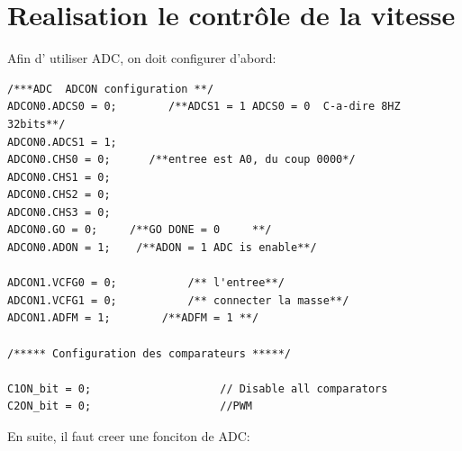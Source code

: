 \documentclass{article}
\begin{document}
\section{Realisation le contrôle de la vitesse}
Afin d' utiliser ADC, on doit configurer d'abord:
   



\begin{lstlisting}[frame=shadowbox]
/***ADC  ADCON configuration **/
ADCON0.ADCS0 = 0;        /**ADCS1 = 1 ADCS0 = 0  C-a-dire 8HZ 32bits**/
ADCON0.ADCS1 = 1;
ADCON0.CHS0 = 0;      /**entree est A0, du coup 0000*/
ADCON0.CHS1 = 0;
ADCON0.CHS2 = 0;
ADCON0.CHS3 = 0;
ADCON0.GO = 0;     /**GO DONE = 0     **/
ADCON0.ADON = 1;    /**ADON = 1 ADC is enable**/

ADCON1.VCFG0 = 0;           /** l'entree**/
ADCON1.VCFG1 = 0;           /** connecter la masse**/
ADCON1.ADFM = 1;        /**ADFM = 1 **/

/***** Configuration des comparateurs *****/

C1ON_bit = 0;                    // Disable all comparators
C2ON_bit = 0;                    //PWM
\end{lstlisting}
En suite, il faut creer une fonciton de ADC:
\end{document}
